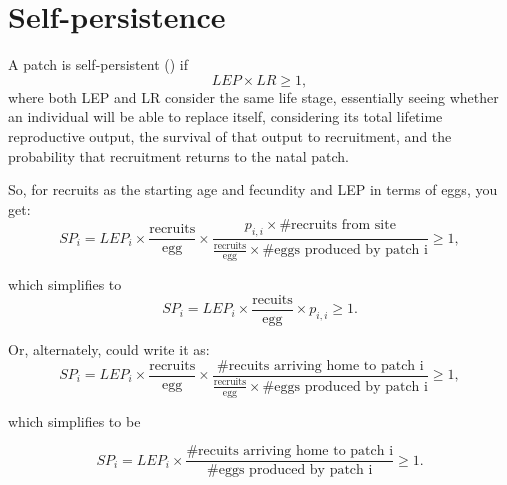 \documentclass[12pt, oneside]{article}   	%
\begin{document}

\section{Self-persistence}
A patch is self-persistent (\cite{burgess2014beyond}) if
\begin{equation}
LEP \times LR \geq 1,
\end{equation}
where both LEP and LR consider the same life stage, essentially seeing whether an individual will be able to replace itself, considering its total lifetime reproductive output, the survival of that output to recruitment, and the probability that recruitment returns to the natal patch.

So, for recruits as the starting age and fecundity and LEP in terms of eggs, you get:
\begin{equation}
SP_i = LEP_{i} \times \frac{\text{recruits}}{\text{egg}} \times \frac{p_{i,i} \times \text{\# recruits from site}}{\frac{\text{recruits}}{\text{egg}} \times \# \text{eggs produced by patch i}} \geq 1, 
\end{equation}

which simplifies to
\begin{equation}
SP_i = LEP_{i} \times \frac{\text{recuits}}{\text{egg}} \times p_{i,i} \geq 1 \label{SP_simp_v2}. %
\end{equation}

Or, alternately, could write it as:
\begin{equation}
SP_i = LEP_{i} \times \frac{\text{recruits}}{\text{egg}} \times \frac{\# \text{recuits arriving home to patch i}}{\frac{\text{recruits}}{\text{egg}} \times \# \text{eggs produced by patch i}} \geq 1, 
\end{equation}

which simplifies to be

\begin{equation}
SP_i = LEP_{i} \times \frac{\# \text{recuits arriving home to patch i}}{\# \text{eggs produced by patch i}} \geq 1 \label{SP_simp_v1}. %
\end{equation}
\end{document}
